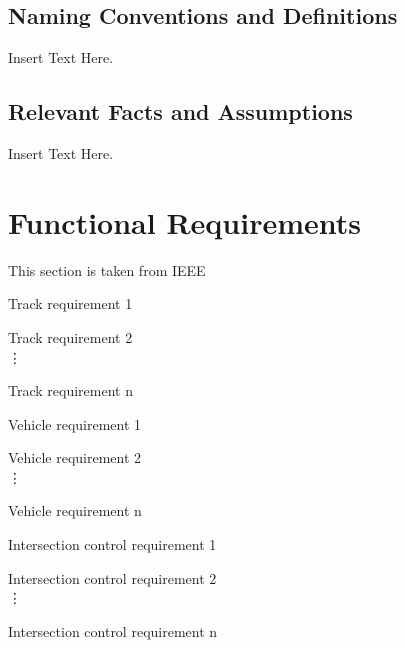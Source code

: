 \documentclass [12pt]{article}
\begin{document}
\subsection{Naming Conventions and Definitions}
	Insert Text Here.
	
\subsection{Relevant Facts and Assumptions} 
	Insert Text Here.



\section {Functional Requirements} 
This section is taken from IEEE


\begin{TRK}
	\setlength{\itemindent}{.5in}
	\itemsep0pt 
	\item Track requirement 1
	\item Track requirement 2 \\
	\hspace *{2 cm}\vdots
	\item Track requirement n
\end{TRK}


\begin{VHL}
	\setlength{\itemindent}{.5in}
	\itemsep0pt 
	\item Vehicle requirement 1
	\item Vehicle requirement 2 \\
	\hspace *{2 cm}\vdots
	\item Vehicle requirement n
\end{VHL}


\begin{ITC}
\setlength{\itemindent}{.5in}
	\itemsep0pt 
	\item Intersection control requirement 1
	\item Intersection control requirement 2 \\
	\hspace *{2 cm}\vdots
	\item Intersection control requirement n
\end{ITC}




%
%
\end{document}
